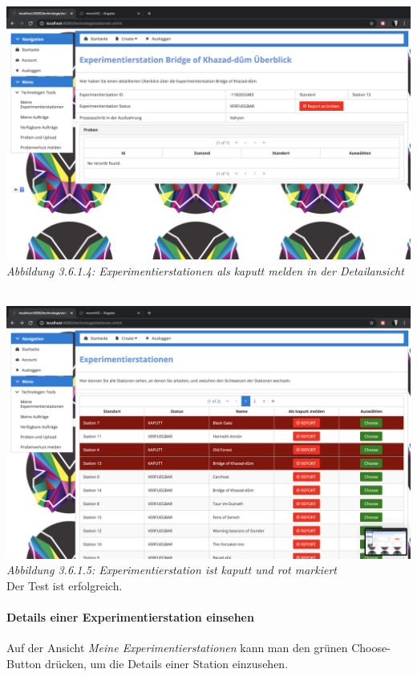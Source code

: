 \documentclass[enabledeprecatedfontcommands,fontsize=12pt,paper=a4,twoside]{scrartcl}
\begin{document}
 \hypertarget{sc3.6.1.4}{
\includegraphics[width=1\textwidth]{Screenshots/3614.png}
\textit{Abbildung 3.6.1.4: Experimentierstationen als kaputt melden in der Detailansicht}
} \\

 \hypertarget{sc3.6.1.5}{
\includegraphics[width=1\textwidth]{Screenshots/3615.png}
\textit{Abbildung 3.6.1.5: Experimentierstation ist kaputt und rot markiert}
} \\

Der Test ist erfolgreich.

%
\paragraph{Details einer Experimentierstation einsehen}

Auf der Ansicht \textit{Meine Experimentierstationen} kann man den grünen Choose-Button drücken, um die Details einer Station einzusehen.
\end{document}
